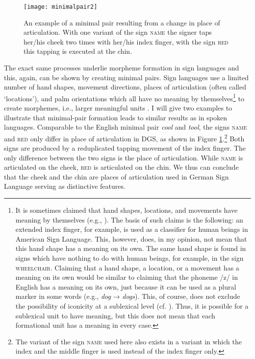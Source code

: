 \begin{figure}[bt]
\centering
	\texttt{[image: minimalpair2]}
	\caption{An example of a minimal pair resulting from a change in place of articulation. With one variant of the sign \textsc{name} the signer taps her/his cheek two times with her/his index finger, with the sign \textsc{red} this tapping is executed at the chin.}
	\label{minimalpairtwo}
\end{figure}

The exact same processes underlie morpheme formation in sign languages and this, again, can be shown by creating minimal pairs. Sign languages use a limited number of hand shapes, movement directions, places of articulation (often called `locations'), and palm orientations which all have no meaning by themselves\footnote{ It is sometimes claimed that hand shapes, locations, and movements have meaning by themselves (e.g., \citealt[943]{sandler2009sign}). The basis of such claims is the following: an extended index finger, for example, is used as a classifier for human beings in American Sign Language. This, however, does, in my opinion, not mean that this hand shape has a meaning on its own. The same hand shape is found in signs which have nothing to do with human beings, for example, in the sign \textsc{wheelchair}. Claiming that a hand shape, a location, or a movement has a meaning on its own would be similar to claiming that the phoneme /z/ in English has a meaning on its own, just because it can be used as a plural marker in some words (e.g., \textit{dog} → \textit{dogs}). This, of course, does not exclude the possibility of iconicity at a sublexical level (cf. \citealt{kooij2002phonological,zwitserlood2008morphologybelow}). Thus, it is possible for a sublexical unit to have meaning, but this does not mean that each formational unit has a meaning in every case.} to create morphemes, i.e., larger meaningful units \citep{stokoe1960sign, battison1978}. I will give two examples to illustrate that minimal-pair formation leads to similar results as in spoken languages. Comparable to the English minimal pair \textit{cool} and \textit{tool}, the signs \textsc{name} and \textsc{red} only differ in place of articulation in DGS, as shown in Figure \ref{minimalpairtwo}.\footnote{ The variant of the sign \textsc{name} used here also exists in a variant in which the index and the middle finger is used instead of the index finger only.} Both signs are produced by a reduplicated tapping movement of the index finger. The only difference between the two signs is the place of articulation. While \textsc{name} is articulated on the cheek, \textsc{red} is articulated on the chin. We thus can conclude that the cheek and the chin are places of articulation used in German Sign Language serving as distinctive features. 

